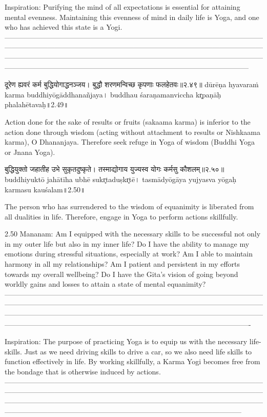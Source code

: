 Inspiration:
Purifying the mind of all expectations is essential for attaining mental evenness. Maintaining this evenness of mind in daily life is Yoga, and one who has achieved this state is a Yogi.
—---------------------------------------------------------------------------------------------------------------------------------------------------------------------------------------------------------------------------------------------------------------------------------------------------------------------------------------------------------------------------------------------------------------------------------------


दूरेण ह्यवरं कर्म बुद्धियोगाद्धनञ्जय। 
बुद्धौ शरणमन्विच्छ कृपणाः फलहेतवः॥२.४९॥
dūrēṇa hyavaraṁ karma buddhiyōgāddhanañjaya। 
buddhau śaraṇamanviccha kr̥paṇāḥ phalahētavaḥ॥2.49॥

Action done for the sake of results or fruits (sakaama karma) is inferior to the action done through wisdom (acting without attachment to results or Nishkaama karma), O Dhananjaya. Therefore seek refuge in Yoga of wisdom (Buddhi Yoga or Jnana Yoga).


बुद्धियुक्तो जहातीह उभे सुकृतदुष्कृते। 
तस्माद्योगाय युज्यस्व योगः कर्मसु कौशलम्॥२.५०॥
buddhiyuktō jahātīha ubhē sukr̥taduṣkr̥tē। 
tasmādyōgāya yujyasva yōgaḥ karmasu kauśalam॥2.50॥

The person who has surrendered to the wisdom of equanimity is liberated from all dualities in life.  Therefore, engage in Yoga to perform actions skillfully. 

2.50 Mananam:
Am I equipped with the necessary skills to be successful not only in my outer life but also in my inner life? Do I have the ability to manage my emotions during stressful situations, especially at work? Am I able to maintain harmony in all my relationships? Am I patient and persistent in my efforts towards my overall wellbeing? Do I have the Gita’s vision of going beyond worldly gains and losses to attain a state of mental equanimity?
—----------------------------------------------------------------------------------------------------------------------------------------------------------------------------------------------------------------------------------------------------------------------------------------------------------------------------------------------------------------------------------------------------------------------------------------
 
Inspiration:
The purpose of practicing Yoga is to equip us with the necessary life-skills. Just as we need driving skills to drive a car, so we also need life skills to function effectively in life. By working skillfully, a Karma Yogi becomes free from the bondage that is otherwise induced by actions.
—------------------------------------------------------------------------------------------------------------------------------------------------------------------------------------------------------------------------------------------------------------------------------------------------------------------------------------------------------------------------------------------------------------------------------------



